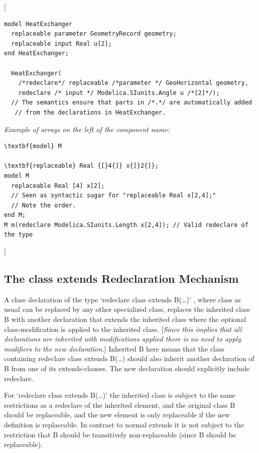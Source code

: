 \documentclass[10pt,a4paper]{report}
\def\doublelabel#1{\label{#1}\hypertarget{#1}{}}
\begin{document}
{[}
\begin{lstlisting}[language=modelica]
model HeatExchanger
  replaceable parameter GeometryRecord geometry;
  replaceable input Real u[2];
end HeatExchanger;

  HeatExchanger(
    /*redeclare*/ replaceable /*parameter */ GeoHorizontal geometry,
    redeclare /* input */ Modelica.SIunits.Angle u /*[2]*/);
  // The semantics ensure that parts in /*.*/ are automatically added
   // from the declarations in HeatExchanger.
\end{lstlisting}

\emph{Example of arrays on the left of the component name:}
\begin{lstlisting}[language=modelica]
\textbf{model} M

\textbf{replaceable} Real {[}4{]} x{[}2{]};
model M
  replaceable Real [4] x[2];
  // Seen as syntactic sugar for "replaceable Real x[2,4];"
  // Note the order.
end M;
M m(redeclare Modelica.SIunits.Length x[2,4]); // Valid redeclare of the type
\end{lstlisting}

{]}

\subsection{The class extends Redeclaration Mechanism}\doublelabel{the-class-extends-redeclaration-mechanism}

A class declaration of the type `redeclare class extends B(\ldots{})' ,
where class as usual can be replaced by any other specialized class,
replaces the inherited class B with another declaration that extends the
inherited class where the optional class-modification is applied to the
inherited class. {[}\emph{Since this implies that all declarations are
inherited with modifications applied there is no need to apply modifiers
to the new declaration.}{]} Inherited B here means that the class
containing redeclare class extends B(\ldots{}) should also inherit
another declaration of B from one of its extends-clauses. The new
declaration should explicitly include redeclare.

For `redeclare class extends B(\ldots{})' the inherited class is subject
to the same restrictions as a redeclare of the inherited element, and
the original class B should be replaceable, and the new element is only
replaceable if the new definition is replaceable. In contrast to normal
extends it is not subject to the restriction that B should be
transitively non-replaceable (since B should be replaceable).
\end{document}
